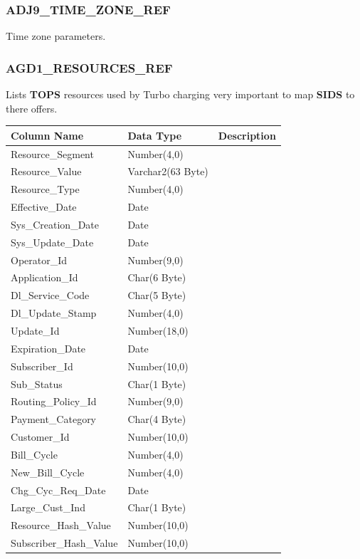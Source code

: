 \documentclass[12pt,twoside]{article}
\begin{document}
\normalsize

\subsubsection{ADJ9\_TIME\_ZONE\_REF}
\label{sec:orgheadline100}
Time zone parameters.

\subsubsection{AGD1\_RESOURCES\_REF}
\label{sec:orgheadline101}
Lists \textbf{TOPS} resources used by Turbo charging very important to map \textbf{SIDS} to there offers.
\footnotesize
\begin{center}
\begin{tabular}{lll}
\hline
\textbf{Column Name} & \textbf{Data Type} & \textbf{Description}\\
\hline
Resource\_Segment & Number(4,0) & \\
Resource\_Value & Varchar2(63 Byte) & \\
Resource\_Type & Number(4,0) & \\
Effective\_Date & Date & \\
Sys\_Creation\_Date & Date & \\
Sys\_Update\_Date & Date & \\
Operator\_Id & Number(9,0) & \\
Application\_Id & Char(6 Byte) & \\
Dl\_Service\_Code & Char(5 Byte) & \\
Dl\_Update\_Stamp & Number(4,0) & \\
Update\_Id & Number(18,0) & \\
Expiration\_Date & Date & \\
Subscriber\_Id & Number(10,0) & \\
Sub\_Status & Char(1 Byte) & \\
Routing\_Policy\_Id & Number(9,0) & \\
Payment\_Category & Char(4 Byte) & \\
Customer\_Id & Number(10,0) & \\
Bill\_Cycle & Number(4,0) & \\
New\_Bill\_Cycle & Number(4,0) & \\
Chg\_Cyc\_Req\_Date & Date & \\
Large\_Cust\_Ind & Char(1 Byte) & \\
Resource\_Hash\_Value & Number(10,0) & \\
Subscriber\_Hash\_Value & Number(10,0) & \\
\hline
\end{tabular}
\end{center}
\normalsize
\end{document}
